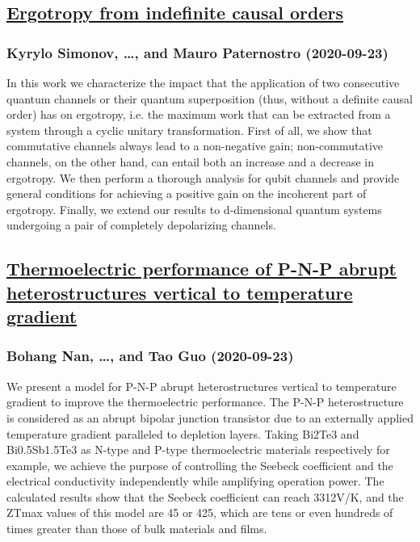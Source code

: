 \subsection*{\href{http://arxiv.org/abs/2009.11265v1}{Ergotropy from indefinite causal orders}}
\subsubsection*{Kyrylo Simonov, \dots, and Mauro Paternostro (2020-09-23)}
In this work we characterize the impact that the application of two
consecutive quantum channels or their quantum superposition (thus, without a
definite causal order) has on ergotropy, i.e. the maximum work that can be
extracted from a system through a cyclic unitary transformation. First of all,
we show that commutative channels always lead to a non-negative gain;
non-commutative channels, on the other hand, can entail both an increase and a
decrease in ergotropy. We then perform a thorough analysis for qubit channels
and provide general conditions for achieving a positive gain on the incoherent
part of ergotropy. Finally, we extend our results to d-dimensional quantum
systems undergoing a pair of completely depolarizing channels.

\subsection*{\href{http://arxiv.org/abs/2009.11255v1}{Thermoelectric performance of P-N-P abrupt heterostructures vertical to  temperature gradient}}
\subsubsection*{Bohang Nan, \dots, and Tao Guo (2020-09-23)}
We present a model for P-N-P abrupt heterostructures vertical to temperature
gradient to improve the thermoelectric performance. The P-N-P heterostructure
is considered as an abrupt bipolar junction transistor due to an externally
applied temperature gradient paralleled to depletion layers. Taking Bi2Te3 and
Bi0.5Sb1.5Te3 as N-type and P-type thermoelectric materials respectively for
example, we achieve the purpose of controlling the Seebeck coefficient and the
electrical conductivity independently while amplifying operation power. The
calculated results show that the Seebeck coefficient can reach 3312V/K, and the
ZTmax values of this model are 45 or 425, which are tens or even hundreds of
times greater than those of bulk materials and films.


